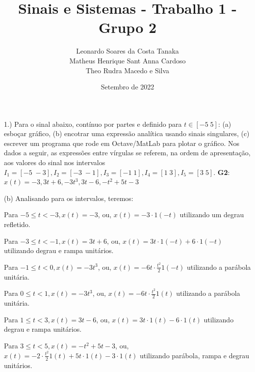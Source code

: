 \documentclass{article}
\title{Sinais e Sistemas - Trabalho 1 - Grupo 2}
\author{
    Leonardo Soares da Costa Tanaka \\
    Matheus Henrique Sant Anna Cardoso \\
    Theo Rudra Macedo e Silva
}
\date{Setembro de 2022}
\begin{document}
\maketitle

1.) Para o sinal abaixo, contínuo por partes e definido para $t \in [-5\;5]$: (a) esboçar gráfico, (b) encotrar uma expressão analítica usando sinais singulares, (c) escrever um programa que rode em Octave/MatLab para plotar o gráfico. Nos dados a seguir, as expressões entre vírgulas se referem, na ordem de apresentação, aos valores do sinal nos intervalos $I_{1} = [-5\;-3], I_{2} = [-3\;-1], I_{3} = [-1\;1], I_{4} = [1\;3], I_{5} = [3\;5]$.
\textbf{G2}: $x(t) = -3, 3t + 6, -3t^3, 3t - 6, -t^2 + 5t - 3$

\vspace{\baselineskip}

(b) Analisando para os intervalos, teremos:

\vspace{\baselineskip}

Para $ -5 \leq t < -3, x(t) = -3 $, ou, $ x(t) = -3 \cdot 1(-t) $ utilizando um degrau refletido.

\vspace{\baselineskip}

Para $ -3 \leq t < -1, x(t) = 3t + 6 $, ou, $ x(t) = 3t \cdot 1(-t) + 6 \cdot 1(-t) $ utilizando degrau e rampa unitários.

\vspace{\baselineskip}

Para $ -1 \leq t < 0, x(t) = -3t^3 $, ou, $ x(t) = -6t \cdot \frac{t^2}{2}1(-t) $ utilizando a parábola unitária.

\vspace{\baselineskip}

Para $ 0 \leq t < 1, x(t) = -3t^3 $, ou, $ x(t) = -6t \cdot \frac{t^2}{2}1(t) $ utilizando a parábola unitária.

\vspace{\baselineskip}

Para $ 1 \leq t < 3, x(t) = 3t - 6 $, ou, $ x(t) = 3t \cdot 1(t) - 6 \cdot 1(t) $ utilizando degrau e rampa unitários.

\vspace{\baselineskip}

Para $ 3 \leq t < 5, x(t) = -t^2 + 5t - 3 $, ou, $ x(t) = -2 \cdot \frac{t^2}{2}1(t) + 5t \cdot 1(t) - 3 \cdot 1(t)$ utilizando parábola, rampa e degrau unitários.

\vspace{\baselineskip}
\end{document}
